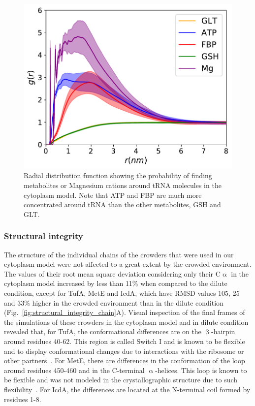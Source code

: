 \documentclass[journal=jpcisd8,manuscript=article]{achemso}
\begin{document}
\begin{figure}[H]
\includegraphics[scale=0.5]{rdf_RNA_metabolites.pdf}
\caption{Radial distribution function showing the probability of
  finding metabolites or Magnesium cations around tRNA molecules in
  the cytoplasm model. Note that ATP and FBP are much more
  concentrated around tRNA than the other metabolites, GSH and GLT.}
\label{fig:tRNA_aggregation}
\end{figure}


\subsubsection{Structural integrity}
The structure of the individual chains of the crowders that were used
in our cytoplasm model were not affected to a great extent by the
crowded environment. The values of their root mean square deviation considering only
their C$\upalpha$ in the cytoplasm model increased by less than 11\% when compared to the dilute condition, except for
TufA, MetE and IcdA, which have RMSD values 105, 25 and 33\% higher in
the crowded environment than in the dilute condition (Fig.~\ref{fig:structural_integrity_chain}A). 
Visual inspection of the final frames of the simulations of these crowders in the cytoplasm model and in dilute condition revealed that, for TufA, the conformational differences are on the $\upbeta$-hairpin around residues 40-62. This region is called Switch I and is known to be flexible and to display conformational changes due to interactions with the ribosome or other partners~\cite{Abel1996}. For MetE, there are differences in the conformation of the loop around residues 450-460 and in the C-terminal $\upalpha$-helices. This loop is known to be flexible and was not modeled in the crystallographic structure due to such flexibility~\cite{Ferrer2004}. For IcdA, the differences are located at the N-terminal coil formed by residues 1-8.
\end{document}

